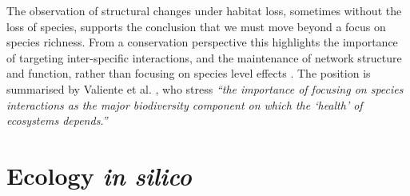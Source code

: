 The observation of structural changes under habitat loss, sometimes without the loss of species, supports the conclusion that we must move beyond a focus on species richness. From a conservation perspective this highlights the importance of targeting inter-specific interactions, and the maintenance of network structure and function, rather than focusing on species level effects \cite{memmott2007conservation}. The position is summarised by Valiente et al. \cite{valiente2015beyond}, who stress \emph{``the importance of focusing on species interactions as the major biodiversity component on which the `health' of ecosystems depends.''}



%
%




\section{Ecology \emph{in silico}}
\label{sec:intro_computers}


